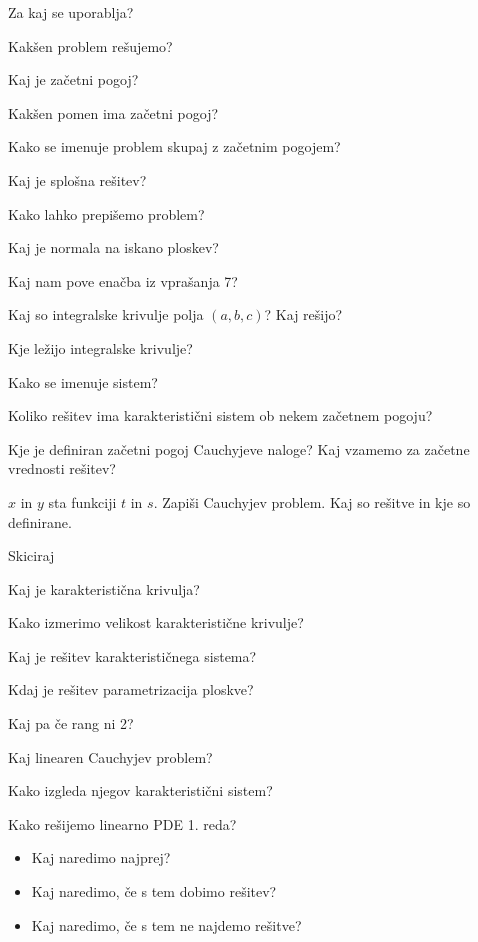 \documentclass{article}
\begin{document}
    \begin{enumerate}
        \item Za kaj se uporablja?
        \item Kakšen problem rešujemo?
        \item Kaj je začetni pogoj?
        {\color{red}\item Kakšen pomen ima začetni pogoj?}
        \item Kako se imenuje problem skupaj z začetnim pogojem?
        \item Kaj je splošna rešitev?
        \item Kako lahko prepišemo problem?
        \item Kaj je normala na iskano ploskev?
        \item Kaj nam pove enačba iz vprašanja 7?
        {\color{red}\item Kaj so integralske krivulje polja $(a, b, c)$? Kaj rešijo?}
        {\color{red}\item Kje ležijo integralske krivulje?}
        \item Kako se imenuje sistem?
        \item Koliko rešitev ima karakteristični sistem ob nekem začetnem pogoju?
        {\color{red}\item Kje je definiran začetni pogoj Cauchyjeve naloge? Kaj vzamemo za začetne vrednosti rešitev?}
        \item $x$ in $y$ sta funkciji $t$ in $s$. Zapiši Cauchyjev problem. Kaj so rešitve in kje so definirane.
        \item Skiciraj
        {\color{red}\item Kaj je karakteristična krivulja?}
        {\color{red}\item Kako izmerimo velikost karakteristične krivulje?}
        {\color{red}\item Kaj je rešitev karakterističnega sistema?}
        {\color{red}\item Kdaj je rešitev parametrizacija ploskve?}
        {\color{red}\item Kaj pa če rang ni 2?}
        \item Kaj linearen Cauchyjev problem?
        \item Kako izgleda njegov karakteristični sistem?
        {\color{red}\item Kako rešijemo linearno PDE 1. reda?}
        \color{red}\begin{itemize}
            \item Kaj naredimo najprej?
            \item Kaj naredimo, če s tem dobimo rešitev?
            \item Kaj naredimo, če s tem ne najdemo rešitve?
        \end{itemize}
    \end{enumerate}
\end{document}
